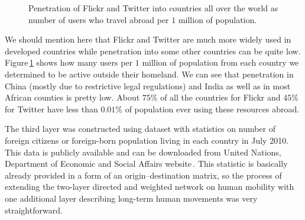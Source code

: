 \documentclass[aps,superscriptaddress,showkeys,nofootinbib]{revtex4-1}
\begin{document}
\begin{figure}[t!]
\centering
{}
\caption{\label{fig::penetration}Penetration of Flickr and Twitter into countries all over the world as number of users who travel abroad per $1$ million of population.}
\end{figure} 

We should mention here that Flickr and Twitter are much more widely used in developed countries while penetration into some other countries can be quite low. Figure\,\ref{fig::penetration} shows how many users per $1$ million of population from each country we determined to be active outside their homeland. We can see that penetration in China (mostly due to restrictive legal regulations) and India as well as in most African counties is pretty low. About $75\%$ of all the countries for Flickr and $45\%$ for Twitter have less than $0.01\%$ of population ever using these resources abroad.

The third layer was constructed using dataset with statistics on number of foreign citizens or foreign-born population living in each country in July 2010. This data is publicly available and can be downloaded from United Nations, Department of Economic and Social Affairs website\,\cite{unMigration}. This statistic is basically already provided in a form of an origin--destination matrix, so the process of extending the two-layer directed and weighted network on human mobility with one additional layer describing long-term human movements was very straightforward.
\end{document}
